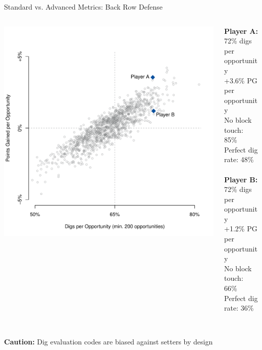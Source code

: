 \documentclass[handout]{beamer}
\begin{document}
\begin{frame}[noframenumbering]{Standard vs. Advanced Metrics: Back Row Defense}
  \begin{columns}
    \begin{column}{0.59\textwidth}
      \includegraphics[width = \textwidth]{images/dig_comparison.pdf}
    \end{column}
    \begin{column}{0.41\textwidth}
      {\bf Player A:}\\
      72\% digs per opportunity\\
      +3.6\% PG per opportunity\\
      {
        \color{ricerichblue}
        No block touch: 85\%\\
        Perfect dig rate: 48\%\\
      }
      ~\\
      {\bf Player B:}\\
      72\% digs per opportunity\\
      +1.2\% PG per opportunity\\
      {
        \color{ricerichblue}
        No block touch: 66\%\\
        Perfect dig rate: 36\%\\
      }
    \end{column}
  \end{columns}
  ~\\
  {\bf Caution:} Dig evaluation codes are biased against setters by design
\end{frame}
\end{document}
